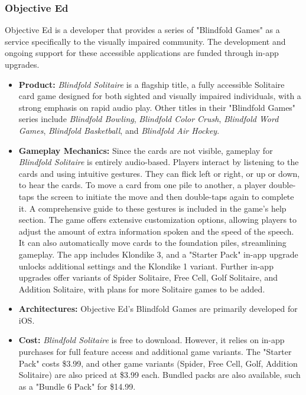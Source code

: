 \subsubsection{Objective Ed}

Objective Ed is a developer that provides a series of "Blindfold Games" as a service specifically to the visually impaired community\supercite{AppleStoreSolitaire}. The development and ongoing support for these accessible applications are funded through in-app upgrades\supercite{AppleStoreSolitaire}.
\begin{itemize}
    \item \textbf{Product:} \textit{Blindfold Solitaire} is a flagship title, a fully accessible Solitaire card game designed for both sighted and visually impaired individuals, with a strong emphasis on rapid audio play\supercite{AppleStoreSolitaire}. Other titles in their "Blindfold Games" series include \textit{Blindfold Bowling}, \textit{Blindfold Color Crush}, \textit{Blindfold Word Games}, \textit{Blindfold Basketball}, and \textit{Blindfold Air Hockey}\supercite{AppleStoreSolitaire}.
    \item \textbf{Gameplay Mechanics:} Since the cards are not visible, gameplay for \textit{Blindfold Solitaire} is entirely audio-based. Players interact by listening to the cards and using intuitive gestures. They can flick left or right, or up or down, to hear the cards. To move a card from one pile to another, a player double-taps the screen to initiate the move and then double-taps again to complete it\supercite{AppleStoreSolitaire}. A comprehensive guide to these gestures is included in the game's help section\supercite{AppleStoreSolitaire}. The game offers extensive customization options, allowing players to adjust the amount of extra information spoken and the speed of the speech\supercite{AppleStoreSolitaire}. It can also automatically move cards to the foundation piles, streamlining gameplay\supercite{AppleStoreSolitaire}. The app includes Klondike 3, and a "Starter Pack" in-app upgrade unlocks additional settings and the Klondike 1 variant. Further in-app upgrades offer variants of Spider Solitaire, Free Cell, Golf Solitaire, and Addition Solitaire, with plans for more Solitaire games to be added\supercite{AppleStoreSolitaire}.
    \item \textbf{Architectures:} Objective Ed's Blindfold Games are primarily developed for iOS\supercite{AppleStoreSolitaire}.
    \item \textbf{Cost:} \textit{Blindfold Solitaire} is free to download. However, it relies on in-app purchases for full feature access and additional game variants. The "Starter Pack" costs \$3.99, and other game variants (Spider, Free Cell, Golf, Addition Solitaire) are also priced at \$3.99 each. Bundled packs are also available, such as a "Bundle 6 Pack" for \$14.99\supercite{AppleStoreSolitaire}.
\end{itemize}

